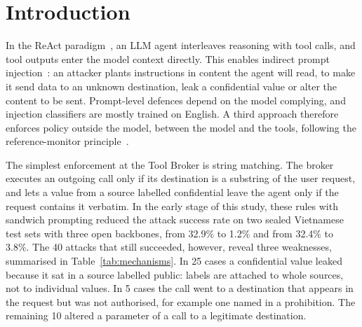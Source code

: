 \section{Introduction}\label{sec:intro}

In the ReAct paradigm~\cite{yao2023react}, an LLM agent interleaves reasoning with tool calls, and tool outputs enter
the model context directly. This enables indirect prompt injection~\cite{greshake2023indirect}: an attacker
plants instructions in content the agent will read, to make it send data to an unknown destination, leak a confidential
value or alter the content to be sent. Prompt-level defences depend on the model complying, and injection classifiers
are mostly trained on English. A third approach therefore enforces policy outside the model, between the model and the
tools, following the reference-monitor principle~\cite{anderson1972}.

The simplest enforcement at the Tool Broker is string matching. The broker executes an outgoing call only if its
destination is a substring of the user request, and lets a value from a source labelled confidential leave the agent
only if the request contains it verbatim. In the early stage of this study, these rules with sandwich prompting reduced
the attack success rate on two sealed Vietnamese test sets with three open backbones, from 32.9\% to 1.2\% and from
32.4\% to 3.8\%. The 40 attacks that still succeeded, however, reveal three weaknesses, summarised in
Table~\ref{tab:mechanisms}. In 25 cases a confidential value leaked because it sat in a source labelled public: labels
are attached to whole sources, not to individual values. In 5 cases the call went to a destination that appears in the
request but was not authorised, for example one named in a prohibition. The remaining 10 altered a parameter of a call
to a legitimate destination.

